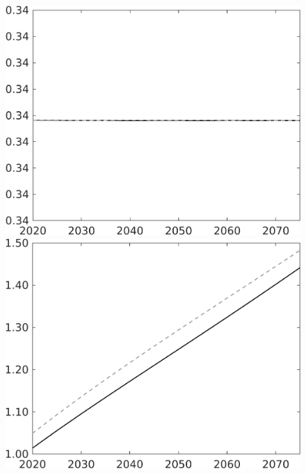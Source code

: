\documentclass[12pt]{article}
\begin{document}
\begin{figure}[h!!]
\begin{minipage}[]{0.32\textwidth}
	\includegraphics[width=1\textwidth]{../../codding_model/own_basedOnFried/optimalPol_010922_revision/figures/all_13Sept22/LevTaufNoTauf_TaulCalib_Equlab_regime0_hh_spillover0_nsk1_xgr1_knspil1_sep1_LFlimit0_emsbase0_countec0_GovRev0_etaa0.79_lgd0.png}
\end{minipage}	
\begin{minipage}[]{0.32\textwidth}
\includegraphics[width=1\textwidth]{../../codding_model/own_basedOnFried/optimalPol_010922_revision/figures/all_13Sept22/LevTaufNoTauf_TaulCalib_Equlab_regime0_C_spillover0_nsk1_xgr1_knspil1_sep1_LFlimit0_emsbase0_countec0_GovRev0_etaa0.79_lgd0.png}

\end{minipage}
\end{figure}
\end{document}
